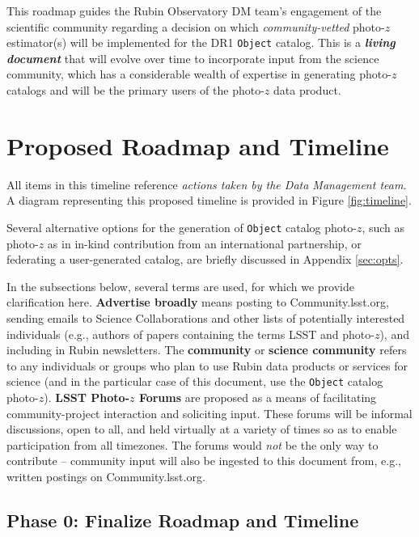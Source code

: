 \documentclass[DM,lsstdraft,toc]{lsstdoc}
\begin{document}
This roadmap guides the Rubin Observatory DM team's engagement of the scientific community regarding a decision on which \textit{community-vetted} photo-$z$ estimator(s) will be implemented for the DR1 {\tt Object} catalog.
This is a \textit{\textbf{living document}} that will evolve over time to incorporate input from the science community, which has a considerable wealth of expertise in generating photo-$z$ catalogs and will be the primary users of the photo-$z$ data product.


\clearpage
\section{Proposed Roadmap and Timeline}\label{sec:time}

All items in this timeline reference {\it actions taken by the Data Management team}.
A diagram representing this proposed timeline is provided in Figure \ref{fig:timeline}.

Several alternative options for the generation of {\tt Object} catalog photo-$z$, such as photo-$z$ as in in-kind contribution from an international partnership, or federating a user-generated catalog, are briefly discussed in Appendix \ref{sec:opts}.

In the subsections below, several terms are used, for which we provide clarification here. 
{\bf Advertise broadly} means posting to Community.lsst.org, sending emails to Science Collaborations and other lists of potentially interested individuals (e.g., authors of papers containing the terms LSST and photo-$z$), and including in Rubin newsletters. 
The {\bf community} or {\bf science community} refers to any individuals or groups who plan to use Rubin data products or services for science (and in the particular case of this document, use the {\tt Object} catalog photo-$z$). 
{\bf LSST Photo-$z$ Forums} are proposed as a means of facilitating community-project interaction and soliciting input.
These forums will be informal discussions, open to all, and held virtually at a variety of times so as to enable participation from all timezones.
The forums would {\it not} be the only way to contribute -- community input will also be ingested to this document from, e.g., written postings on Community.lsst.org.

\subsection{Phase 0: Finalize Roadmap and Timeline}\label{ssec:time_time}
\end{document}
